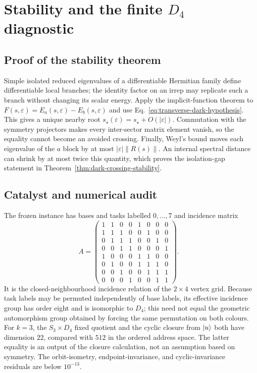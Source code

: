 \section{Stability and the finite \texorpdfstring{$D_4$}{D4} diagnostic}

\subsection{Proof of the stability theorem}
\label{app:dark-stability}

Simple isolated reduced eigenvalues of a differentiable Hermitian family
define differentiable local branches; the identity factor on an irrep may
replicate such a branch without changing its scalar energy.  Apply the
implicit-function theorem to
$F(s,\varepsilon)=E_a(s,\varepsilon)-E_b(s,\varepsilon)$ and use
Eq.~\eqref{eq:transverse-dark-hypothesis}.  This gives a unique nearby root
$s_\star(\varepsilon)=s_\star+O(|\varepsilon|)$.  Commutation with the
symmetry projectors makes every inter-sector matrix element vanish, so the
equality cannot become an avoided crossing.  Finally, Weyl's bound moves
each eigenvalue of the $a$ block by at most
$|\varepsilon|\|R(s)\|$.  An internal spectral distance can shrink by at
most twice this quantity, which proves the isolation-gap statement in
Theorem~\ref{thm:dark-crossing-stability}.

\subsection{Catalyst and numerical audit}
\label{app:d4-catalyst}

The frozen instance has bases and tasks labelled $0,\ldots,7$ and incidence
matrix
\begin{equation}
 A=\begin{pmatrix}
 1&1&0&0&1&0&0&0\\
 1&1&1&0&0&1&0&0\\
 0&1&1&1&0&0&1&0\\
 0&0&1&1&0&0&0&1\\
 1&0&0&0&1&1&0&0\\
 0&1&0&0&1&1&1&0\\
 0&0&1&0&0&1&1&1\\
 0&0&0&1&0&0&1&1
 \end{pmatrix}.
 \label{eq:d4-incidence-matrix}
\end{equation}
It is the closed-neighbourhood incidence relation of the $2\times4$ vertex
grid.  Because task labels may be permuted independently of base labels,
its effective incidence group has order eight and is isomorphic to $D_4$;
this need not equal the geometric automorphism group obtained by forcing the
same permutation on both colours.  For $k=3$, the $S_3\times D_4$ fixed
quotient and the cyclic closure from $\lvert u\rangle$ both have dimension $22$,
compared with $512$ in the ordered address space.  The latter equality is an output of the closure calculation,
not an assumption based on symmetry.  The orbit-isometry,
endpoint-invariance, and cyclic-invariance residuals are below $10^{-13}$.

